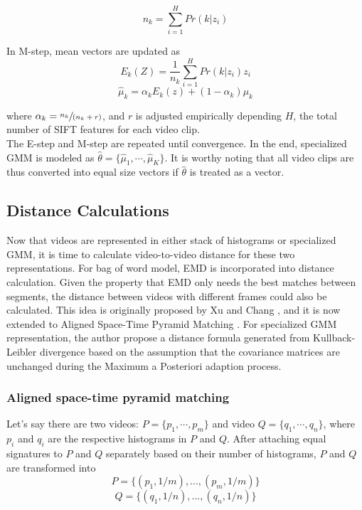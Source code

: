 	\begin{equation}
	n_k = \sum_{i=1}^{H}Pr(k|z_i)
	\end{equation}

	\noindent In M-step, mean vectors are updated as
	\begin{equation}
	E_k(Z) = \frac{1}{n_k} \sum_{i=1}^{H} Pr(k|z_i) z_i
	\end{equation}
	\begin{equation}
	\hat\mu_k = \alpha_k E_k(z) + (1 - \alpha_k) \mu_k
	\end{equation}

	\noindent where $\alpha_k = \sfrac{n_k}{(n_k + r)}$, and $r$ is adjusted empirically depending $H$, the total number of SIFT features for each video clip.\\

	\noindent The E-step and M-step are repeated until convergence. In the end, specialized GMM is modeled as $\hat\theta = \{\hat\mu_1, \cdots, \hat\mu_K \}$. It is worthy noting that all video clips are thus converted into equal size vectors if $\hat\theta$ is treated as a vector.

\subsection{Distance Calculations}
	Now that videos are represented in either stack of histograms or specialized GMM, it is time to calculate video-to-video distance for these two representations. For bag of word model, EMD is incorporated into distance calculation. Given the property that EMD only needs the best matches between segments, the distance between videos with different frames could also be calculated. This idea is originally proposed by Xu and Chang \cite{xu2007visual}, and it is now extended to Aligned Space-Time Pyramid Matching \cite{duan2012visual}. For specialized GMM representation, the author \cite{zhou2008sift} propose a distance formula generated from Kullback-Leibler divergence based on the assumption that the covariance matrices are unchanged during the Maximum a Posteriori adaption process.
	
	\subsubsection{Aligned space-time pyramid matching}
	Let's say there are two videos: $P = \{p_1, \cdots, p_m\}$ and video $Q = \{q_1, \cdots, q_n\}$, where $p_i$ and $q_i$ are the respective histograms in $P$ and $Q$. After attaching equal signatures to $P$ and $Q$ separately based on their number of histograms, $P$ and $Q$ are transformed into
	$$P = \{(p_1, 1 / m),...,(p_m, 1 / m) \}$$
	$$Q = \{(q_1, 1 / n),...,(q_n, 1 / n) \}$$
	
